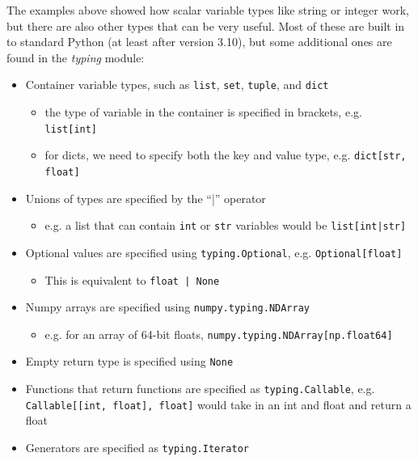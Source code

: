 The examples above showed how scalar variable types like string or integer work, but there are also other types that can be very useful. Most of these are built in to standard Python (at least after version 3.10), but some additional ones are found in the \textit{typing} module:

\begin{itemize}
\item Container variable types, such as \texttt{list}, \texttt{set}, \texttt{tuple}, and \texttt{dict}

\begin{itemize}
\item the type of variable in the container is specified in brackets, e.g. \texttt{list[int]}
\item for dicts, we need to specify both the key and value type, e.g. \texttt{dict[str, float]}
\end{itemize}


\item Unions of types are specified by the ``|'' operator

\begin{itemize}
\item e.g. a list that can contain \texttt{int} or \texttt{str} variables would be \texttt{list[int|str]}
\end{itemize}


\item Optional values are specified using \texttt{typing.Optional}, e.g. \texttt{Optional[float]}

\begin{itemize}
\item This is equivalent to \texttt{float | None}
\end{itemize}


\item Numpy arrays are specified using \texttt{numpy.typing.NDArray}

\begin{itemize}
\item e.g. for an array of 64-bit floats, \texttt{numpy.typing.NDArray[np.float64]}
\end{itemize}


\item Empty return type is specified using \texttt{None}
\item Functions that return functions are specified as \texttt{typing.Callable}, e.g. \texttt{Callable[[int, float], float]} would take in an int and float and return a float
\item Generators are specified as \texttt{typing.Iterator}
\end{itemize}


